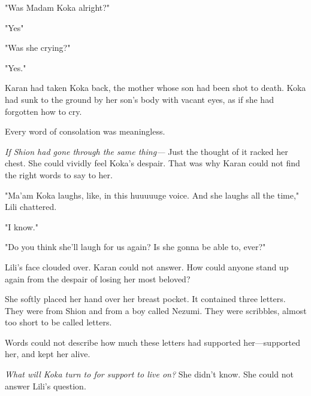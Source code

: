"Was Madam Koka alright?"

"Yes\el "

"Was she crying?"

"Yes."

Karan had taken Koka back, the mother whose son had been shot to death.
Koka had sunk to the ground by her son's body with vacant eyes, as if
she had forgotten how to cry.

Every word of consolation was meaningless.

\emph{If Shion had gone through the same thing---} Just the thought of it racked
her chest. She could vividly feel Koka's despair. That was why Karan
could not find the right words to say to her.

"Ma'am Koka laughs, like, in this huuuuuge voice. And she laughs all the
time," Lili chattered.

"I know."

"Do you think she'll laugh for us again? Is she gonna be able to, ever?"

Lili's face clouded over. Karan could not answer. How could anyone stand
up again from the despair of losing her most beloved?

She softly placed her hand over her breast pocket. It contained three
letters. They were from Shion and from a boy called Nezumi. They were
scribbles, almost too short to be called letters.

\myspace


\myspace


\myspace


\myspace

Words could not describe how much these letters had supported
her---supported her, and kept her alive.

\emph{What will Koka turn to for support to live on?} She didn't know. She
could not answer Lili's question.

